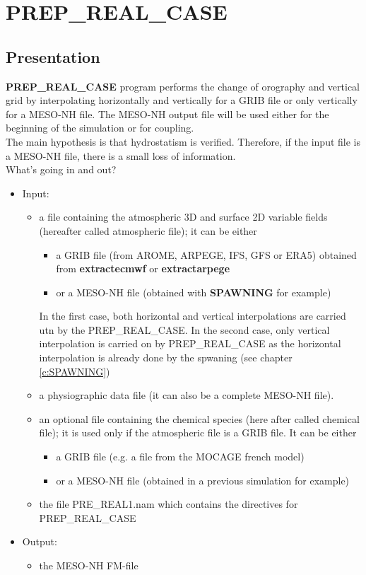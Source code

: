 \chapter{{\bf PREP\_REAL\_CASE}}\label{c:PREPREAL}
\section{Presentation}
{\bf PREP\_REAL\_CASE } program performs the change of
orography and vertical grid by interpolating horizontally and vertically for a 
GRIB file or only vertically for a MESO-NH file. The MESO-NH output file  will
 be used either for the beginning of the simulation or for coupling.\\
The main hypothesis is that hydrostatism is verified.
Therefore, if the input file is a MESO-NH file, there is a small 
loss of information.\\

What's going in and out?
\begin{itemize}
\item Input:
\begin{itemize}
\item a file containing the atmospheric 3D and surface 2D variable fields
(hereafter called atmospheric file); it can be
either
\begin{itemize}
\item a GRIB file (from AROME, ARPEGE, IFS, GFS or ERA5) obtained from {\bf extractecmwf} or {\bf extractarpege}
\item or a MESO-NH file (obtained with {\bf SPAWNING} for example)
\end{itemize}
In the first case, both horizontal and vertical interpolations are carried
 utn by the PREP\_REAL\_CASE. In the second case, only vertical interpolation is 
carried on by PREP\_REAL\_CASE  as the horizontal interpolation is already 
done by the spwaning (see chapter \ref{c:SPAWNING})
\item a physiographic data file (it can also be a complete MESO-NH file).
\item an optional file containing the chemical species (here after called
chemical file); it is used only if the atmospheric file is a GRIB file. 
It can be either
\begin{itemize}
\item a GRIB file (e.g. a file from the MOCAGE french model)
\item or a MESO-NH file (obtained in a previous simulation for example)
\end{itemize}
\item the file PRE\_REAL1.nam which contains the directives for PREP\_REAL\_CASE
\end{itemize}
\item Output:
\begin{itemize}
\item the MESO-NH FM-file
\end{itemize}
\end{itemize}


